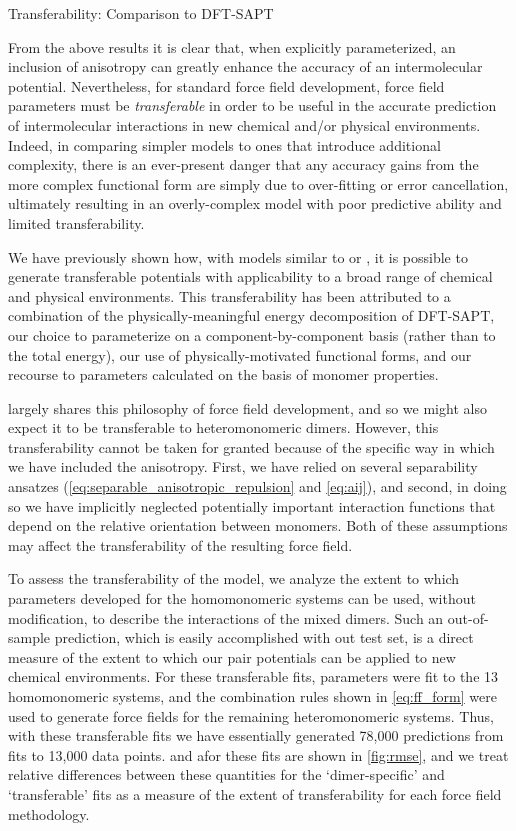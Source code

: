 \begin{subsection}{Transferability: Comparison to DFT-SAPT}
\label{sec:transferability}

From the above results it is clear that, when explicitly parameterized, an
inclusion of anisotropy can greatly enhance the accuracy of an intermolecular
potential. Nevertheless, for standard force field development, force field
parameters must be \emph{transferable} in order to be
useful in the accurate prediction of intermolecular
interactions in new chemical and/or physical environments. Indeed, in comparing
simpler models to ones that
introduce additional complexity, 
there is an ever-present danger that any accuracy
gains from the more complex functional form are simply due to
over-fitting or error cancellation,\cite{Hawkins2004} ultimately resulting in an overly-complex
model with poor predictive ability and limited transferability. 

We have previously shown how, with models
similar to \isoff\cite{McDaniel2013,Schmidt2015} or
\isaff,\cite{VanVleet2016} 
it is possible to generate transferable potentials with
applicability to a broad range of chemical and physical
environments.\cite{Schmidt2015} This transferability has been
attributed to a
combination of the physically-meaningful energy decomposition of DFT-SAPT, our
choice to parameterize on a component-by-component basis (rather than to the
total energy), our use of physically-motivated functional forms, and our 
recourse to parameters calculated on the basis of monomer
properties.\cite{VanVleet2016,McDaniel2013,Schmidt2015}

\mastiff largely shares this philosophy of force field development, and so we
might also expect it to be transferable to heteromonomeric dimers. However,
this transferability cannot be taken for granted because of the specific way
in which we have included the anisotropy. First, we have relied on several
separability ansatzes (\cref{eq:separable_anisotropic_repulsion} and
\cref{eq:aij}), and second, in doing so we have implicitly neglected
potentially important interaction functions that depend on the relative
orientation between monomers. Both of these assumptions may affect the
transferability of the resulting force field.

To assess the transferability of the \mastiff model, we analyze the extent to
which parameters developed for the homomonomeric systems can be used, without
modification, to describe the interactions of the mixed dimers. Such an out-of-sample
prediction, which is easily accomplished with out test set, is a direct
measure of the extent to which our pair potentials can be applied to new
chemical environments. For these transferable fits, parameters were fit to the
13 homomonomeric systems, and the combination rules shown in
\cref{eq:ff_form} were used
to generate force fields for the remaining heteromonomeric systems. Thus, with these
transferable fits we have essentially generated 78,000 predictions from fits
to 13,000 data points. \rmse and a\rmse for these fits are shown in
\cref{fig:rmse}, and we treat
relative differences between these quantities for the `dimer-specific' and
`transferable' fits as a measure of the extent of transferability for each force
field methodology.


\end{subsection}

